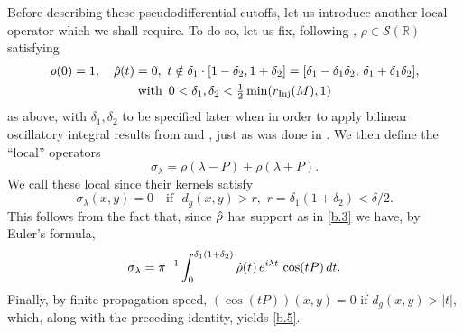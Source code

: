 \documentclass[10pt]{amsart}
\newcommand{\la}{\lambda}
\newcommand{\Inj}{r_{\rm{Inj}}}
\newcommand{\1}{{\bf 1}}
\newcommand{\R}{{\mathbb R}}
\begin{document}
Before describing these pseudodifferential cutoffs, let us introduce another local operator which we shall require.  To do so, let us
fix, following \cite{HSp},  $\rho\in {\mathcal S}(\R)$ satisfying
\begin{multline}\label{b.3}
\rho(0)=1, \quad \Hat \rho(t)=0, \, \, t\notin \delta_1\cdot [1-\delta_2,1+\delta_2]=[\delta_1-\delta_1\delta_2, \, 
\delta_1+\delta_1\delta_2], 
\\
\text{with } \, 0
<\delta_1, \delta_2 <\tfrac12 \min(\Inj(M),1)
\end{multline}
 as above, with $\delta_1,\delta_2$
  to be specified later when in order to apply 
bilinear oscillatory integral results from \cite{LeeBilinear} and \cite{TaoVargasVega}, just as was done
in \cite{HSp}.    We then define the ``local'' operators
\begin{equation}\label{b.4}
\sigma_\la =\rho(\la-P)+\rho(\la+P).
\end{equation}
We call these local since their kernels satisfy
\begin{equation}\label{b.5}
\sigma_\la(x,y)=0 \quad \text{if } \, \, d_g(x,y)>r, \, \, 
r= \delta_1(1+\delta_2)<\delta/2.
\end{equation}
This follows from the fact that, since $\Hat \rho$ has support as in \eqref{b.3} we have, by Euler's formula,
\begin{equation}\label{b.5'}
\sigma_\la =\pi^{-1}\int_0^{\delta_1(1+\delta_2)} \Hat \rho(t) \, e^{i\la t}\,  \cos(tP)\, dt.
\end{equation}
Finally, by finite propagation speed, $(\cos (tP))(x,y)=0$ if $d_g(x,y)>|t|$, which, along with the preceding
identity, yields \eqref{b.5}.
\end{document}
